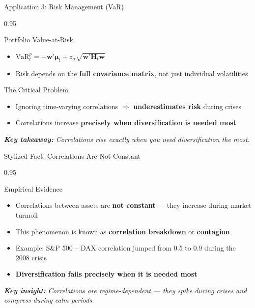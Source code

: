 \documentclass[9pt, aspectratio=169, t]{beamer}
\begin{document}
\begin{frame}{Application 3: Risk Management (VaR)}
    \begin{cminipage}{0.95\textwidth}
    {\footnotesize
    \begin{block}{Portfolio Value-at-Risk}
        \begin{itemize}\setlength{\itemsep}{2pt}
            \item $\text{VaR}_t^p = -\mathbf{w}'\boldsymbol{\mu}_t + z_\alpha \sqrt{\mathbf{w}'\mathbf{H}_t\mathbf{w}}$
            \item Risk depends on the \textbf{full covariance matrix}, not just individual volatilities
        \end{itemize}
    \end{block}
    \vspace{0.1cm}
    \begin{alertblock}{The Critical Problem}
        \begin{itemize}\setlength{\itemsep}{0pt}
            \item Ignoring time-varying correlations $\Rightarrow$ \textbf{underestimates risk} during crises
            \item Correlations increase \textbf{precisely when diversification is needed most}
        \end{itemize}
    \end{alertblock}
    \vspace{0.2cm}
    \textit{\textbf{Key takeaway:} Correlations rise exactly when you need diversification the most.}
    }
    \end{cminipage}
\end{frame}

\begin{frame}{Stylized Fact: Correlations Are Not Constant}
    \begin{cminipage}{0.95\textwidth}
    {\footnotesize
    \begin{block}{Empirical Evidence}
        \begin{itemize}\setlength{\itemsep}{2pt}
            \item Correlations between assets are \textbf{not constant} --- they increase during market turmoil
            \item This phenomenon is known as \textbf{correlation breakdown} or \textbf{contagion}
            \item Example: S\&P 500 -- DAX correlation jumped from 0.5 to 0.9 during the 2008 crisis
            \item \textbf{Diversification fails precisely when it is needed most}
        \end{itemize}
    \end{block}
    \vspace{0.2cm}
    \textit{\textbf{Key insight:} Correlations are regime-dependent --- they spike during crises and compress during calm periods.}
    }
    \end{cminipage}
\end{frame}
\end{document}
